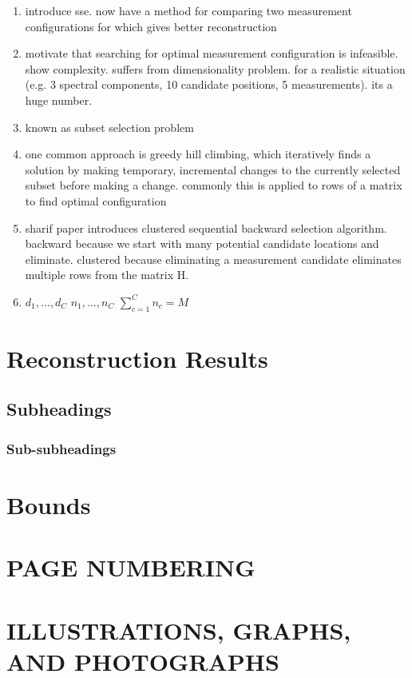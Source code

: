 \documentclass{article}
\begin{document}
\begin{enumerate}
  \item introduce sse.  now have a method for comparing two measurement
    configurations for which gives better reconstruction
  \item motivate that searching for optimal measurement configuration is
    infeasible.  show complexity.  suffers from dimensionality problem. for a realistic situation (e.g. 3 spectral
    components, 10 candidate positions, 5 measurements). its a huge number.
  \item known as subset selection problem
  \item one common approach is greedy hill climbing, which iteratively finds
    a solution by making temporary, incremental changes to the currently
    selected subset before making a change. commonly this is applied to rows
    of a matrix to find optimal configuration
  \item sharif paper introduces clustered sequential backward selection
    algorithm.  backward because we start with many potential candidate locations and eliminate.
    clustered because eliminating a measurement candidate eliminates
    multiple rows from the matrix H.
    \item $d_1, \dots, d_C$  $n_1, \dots, n_C$  $\sum_{c=1}^C n_c = M$
\end{enumerate}


\section{Reconstruction Results}

\subsection{Subheadings}

\subsubsection{Sub-subheadings}

\section{Bounds}

\section{PAGE NUMBERING}

\section{ILLUSTRATIONS, GRAPHS, AND PHOTOGRAPHS}
\end{document}
